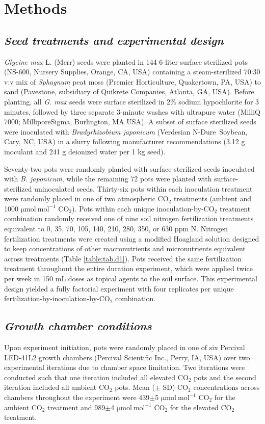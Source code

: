 \section{Methods}
\subsection{\textit{Seed treatments and experimental design}}
\noindent \textit{Glycine max} L. (Merr) seeds were planted in 144 6-liter surface sterilized pots (NS-600, Nursery Supplies, Orange, CA, USA) containing a steam-sterilized 70:30 v:v mix of \textit{Sphagnum} peat moss (Premier Horticulture, Quakertown, PA, USA) to sand (Pavestone, subsidiary of Quikrete Companies, Atlanta, GA, USA). Before planting, all \textit{G. max} seeds were surface sterilized in 2\% sodium hypochlorite for 3 minutes, followed by three separate 3-minute washes with ultrapure water (MilliQ 7000; MilliporeSigma, Burlington, MA USA). A subset of surface sterilized seeds were inoculated with \textit{Bradyrhizobium japonicum} (Verdesian N-Dure\texttrademark\ Soybean, Cary, NC, USA) in a slurry following manufacturer recommendations (3.12 g inoculant and 241 g deionized water per 1 kg seed).
    
Seventy-two pots were randomly planted with surface-sterilized seeds inoculated with \textit{B. japonicum}, while the remaining 72 pots were planted with surface-sterilized uninoculated seeds. Thirty-six pots within each inoculation treatment were randomly placed in one of two atmospheric CO$_2$ treatments (ambient and 1000 $\mathrm{\mu mol\ mol^{-1}}$ CO$_2$). Pots within each unique inoculation-by-CO$_2$ treatment combination randomly received one of nine soil nitrogen fertilization treatments equivalent to 0, 35, 70, 105, 140, 210, 280, 350, or 630 ppm N. Nitrogen fertilization treatments were created using a modified Hoagland solution  designed to keep concentrations of other macronutrients and micronutrients equivalent across treatments (Table \ref{table:tab.d1}). Pots received the same fertilization treatment throughout the entire duration experiment, which were applied twice per week in 150 mL doses as topical agents to the soil surface. This experimental design yielded a fully factorial experiment with four replicates per unique fertilization-by-inoculation-by-CO$_2$ combination.

\subsection{\textit{Growth chamber conditions}}
\noindent Upon experiment initiation, pots were randomly placed in one of six Percival LED-41L2 growth chambers (Percival Scientific Inc., Perry, IA, USA) over two experimental iterations due to chamber space limitation. Two iterations were conducted such that one iteration included all elevated CO$_2$ pots and the second iteration included all ambient CO$_2$ pots. Mean ($\pm$ SD) CO$_2$ concentrations across chambers throughout the experiment were 439$\pm$5 $\mathrm{\mu mol\ mol^{-1}}$ CO$_2$ for the ambient CO$_2$ treatment and 989$\pm$4 $\mathrm{\mu mol\ mol^{-1}}$ CO$_2$ for the elevated CO$_2$ treatment.
    
